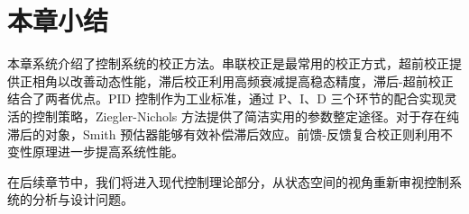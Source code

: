 \section{本章小结}

本章系统介绍了控制系统的校正方法。串联校正是最常用的校正方式，超前校正提供正相角以改善动态性能，滞后校正利用高频衰减提高稳态精度，滞后-超前校正结合了两者优点。PID 控制作为工业标准，通过 P、I、D 三个环节的配合实现灵活的控制策略，Ziegler-Nichols 方法提供了简洁实用的参数整定途径。对于存在纯滞后的对象，Smith 预估器能够有效补偿滞后效应。前馈-反馈复合校正则利用不变性原理进一步提高系统性能。

在后续章节中，我们将进入现代控制理论部分，从状态空间的视角重新审视控制系统的分析与设计问题。
